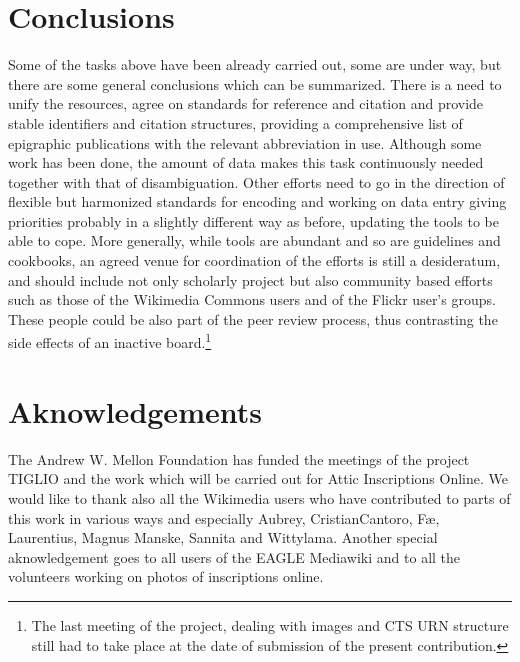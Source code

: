 \documentclass[amsthm,ebook]{saparticle}
\begin{document}
\section{Conclusions}
Some of the tasks above have been already carried out, some are under way, but there are some general conclusions which can be summarized. There is a need to unify the resources, agree on standards for reference and citation and provide stable identifiers and citation structures, providing a comprehensive list of epigraphic publications with the relevant abbreviation in use. Although some work has been done, the amount of data makes this task continuously needed together with that of disambiguation. Other efforts need to go in the direction of flexible but harmonized standards for encoding and working on data entry giving priorities probably in a  slightly different way as before, updating the tools to be able to cope. More generally, while tools are abundant and so are guidelines and cookbooks, an agreed venue for coordination of the efforts is still a desideratum, and should include not only scholarly project but also community based efforts such as those of the Wikimedia Commons users and of the Flickr user's groups. These people could be also part of the peer review process, thus contrasting the side effects of an inactive board.\footnote{The last meeting of the project, dealing with images and CTS URN structure still had to take place at the date of submission of the present contribution.}

\section*{Aknowledgements}
The Andrew W. Mellon Foundation has funded the meetings of the project TIGLIO and the work which will be carried out for Attic Inscriptions Online. We would like to thank also all the Wikimedia users who have contributed to parts of this work in various ways and especially Aubrey, CristianCantoro, Fæ, Laurentius, Magnus Manske, Sannita and Wittylama. Another special aknowledgement goes to all users of the EAGLE Mediawiki and to all the volunteers working on photos of inscriptions online.




\end{document}
